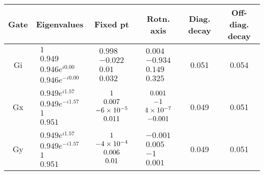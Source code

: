{\begin{table}[h]
\begin{center}
\begin{tabular}[l]{|c|c|c|c|c|c|}
\hline
Gate & Eigenvalues & Fixed pt & Rotn. axis & Diag. decay & Off-diag. decay \\ \hline
Gi & $ \begin{array}{c}
1 \\ 
0.949 \\ 
0.946e^{i0.00} \\ 
0.946e^{-i0.00}
 \end{array} $
 & $ \begin{array}{c}
0.998 \\ 
-0.022 \\ 
0.01 \\ 
0.032
 \end{array} $
 & $ \begin{array}{c}
0.004 \\ 
-0.934 \\ 
0.149 \\ 
0.325
 \end{array} $
 & 0.051 & 0.054 \\ \hline
Gx & $ \begin{array}{c}
0.949e^{i1.57} \\ 
0.949e^{-i1.57} \\ 
1 \\ 
0.951
 \end{array} $
 & $ \begin{array}{c}
1 \\ 
0.007 \\ 
-6\times 10^{-5} \\ 
0.011
 \end{array} $
 & $ \begin{array}{c}
0.001 \\ 
-1 \\ 
4\times 10^{-7} \\ 
-0.001
 \end{array} $
 & 0.049 & 0.051 \\ \hline
Gy & $ \begin{array}{c}
0.949e^{i1.57} \\ 
0.949e^{-i1.57} \\ 
1 \\ 
0.951
 \end{array} $
 & $ \begin{array}{c}
1 \\ 
-4\times 10^{-4} \\ 
0.006 \\ 
0.01
 \end{array} $
 & $ \begin{array}{c}
-0.001 \\ 
0.005 \\ 
-1 \\ 
0.001
 \end{array} $
 & 0.049 & 0.051 \\ \hline
\end{tabular}


\end{center}
\end{table}}
